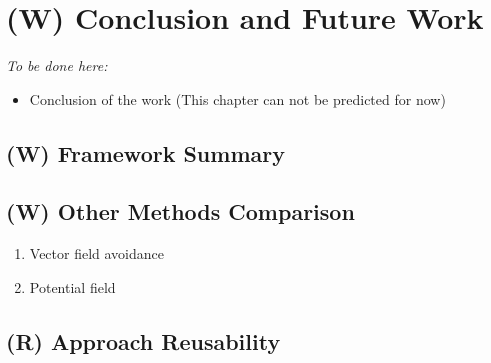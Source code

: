 \chapter{(W) Conclusion and Future Work}\label{ch:Conclusion}
    \emph{To be done here:}
    \begin{itemize}
        \item Conclusion of the work (This chapter can not be predicted for now)
    \end{itemize}



\section{(W) Framework Summary}
    
\section{(W) Other Methods Comparison}\label{s:OtherMethodsComparison}

\begin{enumerate}
	\item Vector field avoidance \cite{borenstein1991vector}
	\item Potential field \cite{koren1991potential}
\end{enumerate}

\section{(R) Approach Reusability}\label{s:approachReusability}
